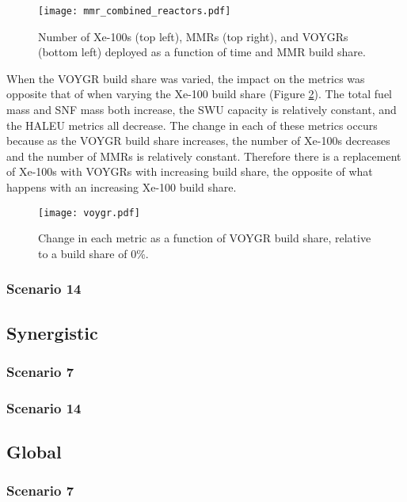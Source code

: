 \begin{figure}
    \centering
    \texttt{[image: mmr\_combined\_reactors.pdf]}
    \caption{Number of Xe-100s (top left), MMRs (top right), and 
    VOYGRs (bottom left) deployed as a function of time and 
    MMR build share.}
    \label{fig:mmr_reactors_s7}
\end{figure}

When the VOYGR build share was varied, the impact on the metrics was 
opposite that of when varying the Xe-100 build share (Figure 
\ref{fig:voygr_scenario7}). The total fuel mass and \gls{SNF} mass both 
increase, the \gls{SWU} capacity is relatively constant, and the 
\gls{HALEU} metrics all decrease. The change in each of these metrics 
occurs because as the VOYGR build share increases, the number of Xe-100s 
decreases and the number of \glspl{MMR} is relatively constant. Therefore 
there is a replacement of Xe-100s with VOYGRs with increasing build share, 
the opposite of what happens with an increasing Xe-100 build share. 

\begin{figure}
    \centering
    \texttt{[image: voygr.pdf]}
    \caption{Change in each metric as a function of VOYGR build share, 
    relative to a build share of 0\%.}
    \label{fig:voygr_scenario7}
\end{figure}

\subsubsection{Scenario 14}

\subsection{Synergistic}
\subsubsection{Scenario 7}

\subsubsection{Scenario 14}

\subsection{Global}
\subsubsection{Scenario 7}

